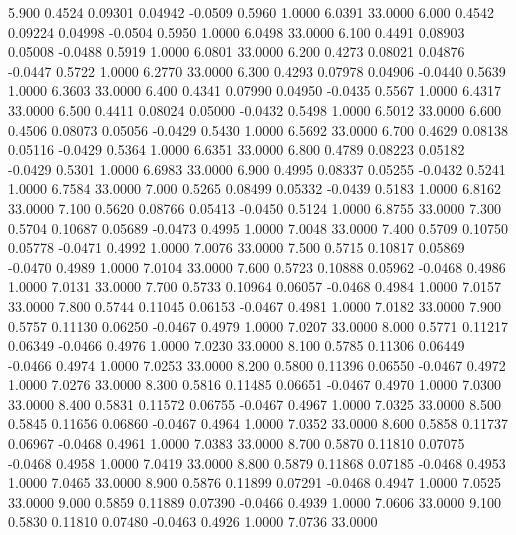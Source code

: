    5.900   0.4524   0.09301   0.04942  -0.0509   0.5960   1.0000   6.0391  33.0000
   6.000   0.4542   0.09224   0.04998  -0.0504   0.5950   1.0000   6.0498  33.0000
   6.100   0.4491   0.08903   0.05008  -0.0488   0.5919   1.0000   6.0801  33.0000
   6.200   0.4273   0.08021   0.04876  -0.0447   0.5722   1.0000   6.2770  33.0000
   6.300   0.4293   0.07978   0.04906  -0.0440   0.5639   1.0000   6.3603  33.0000
   6.400   0.4341   0.07990   0.04950  -0.0435   0.5567   1.0000   6.4317  33.0000
   6.500   0.4411   0.08024   0.05000  -0.0432   0.5498   1.0000   6.5012  33.0000
   6.600   0.4506   0.08073   0.05056  -0.0429   0.5430   1.0000   6.5692  33.0000
   6.700   0.4629   0.08138   0.05116  -0.0429   0.5364   1.0000   6.6351  33.0000
   6.800   0.4789   0.08223   0.05182  -0.0429   0.5301   1.0000   6.6983  33.0000
   6.900   0.4995   0.08337   0.05255  -0.0432   0.5241   1.0000   6.7584  33.0000
   7.000   0.5265   0.08499   0.05332  -0.0439   0.5183   1.0000   6.8162  33.0000
   7.100   0.5620   0.08766   0.05413  -0.0450   0.5124   1.0000   6.8755  33.0000
   7.300   0.5704   0.10687   0.05689  -0.0473   0.4995   1.0000   7.0048  33.0000
   7.400   0.5709   0.10750   0.05778  -0.0471   0.4992   1.0000   7.0076  33.0000
   7.500   0.5715   0.10817   0.05869  -0.0470   0.4989   1.0000   7.0104  33.0000
   7.600   0.5723   0.10888   0.05962  -0.0468   0.4986   1.0000   7.0131  33.0000
   7.700   0.5733   0.10964   0.06057  -0.0468   0.4984   1.0000   7.0157  33.0000
   7.800   0.5744   0.11045   0.06153  -0.0467   0.4981   1.0000   7.0182  33.0000
   7.900   0.5757   0.11130   0.06250  -0.0467   0.4979   1.0000   7.0207  33.0000
   8.000   0.5771   0.11217   0.06349  -0.0466   0.4976   1.0000   7.0230  33.0000
   8.100   0.5785   0.11306   0.06449  -0.0466   0.4974   1.0000   7.0253  33.0000
   8.200   0.5800   0.11396   0.06550  -0.0467   0.4972   1.0000   7.0276  33.0000
   8.300   0.5816   0.11485   0.06651  -0.0467   0.4970   1.0000   7.0300  33.0000
   8.400   0.5831   0.11572   0.06755  -0.0467   0.4967   1.0000   7.0325  33.0000
   8.500   0.5845   0.11656   0.06860  -0.0467   0.4964   1.0000   7.0352  33.0000
   8.600   0.5858   0.11737   0.06967  -0.0468   0.4961   1.0000   7.0383  33.0000
   8.700   0.5870   0.11810   0.07075  -0.0468   0.4958   1.0000   7.0419  33.0000
   8.800   0.5879   0.11868   0.07185  -0.0468   0.4953   1.0000   7.0465  33.0000
   8.900   0.5876   0.11899   0.07291  -0.0468   0.4947   1.0000   7.0525  33.0000
   9.000   0.5859   0.11889   0.07390  -0.0466   0.4939   1.0000   7.0606  33.0000
   9.100   0.5830   0.11810   0.07480  -0.0463   0.4926   1.0000   7.0736  33.0000
